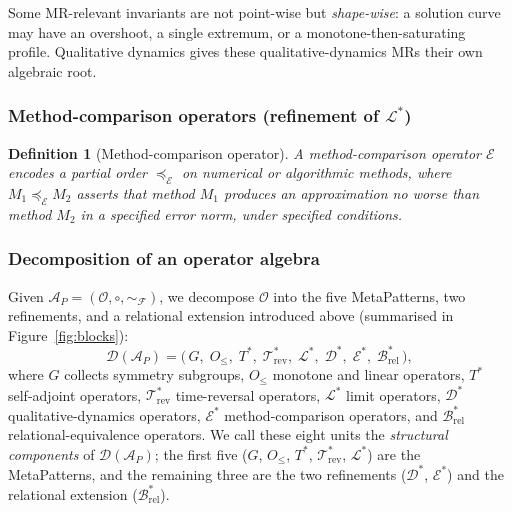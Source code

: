 \documentclass[acmsmall,screen,review]{acmart}
\newtheorem{definition}{Definition}
\begin{document}
Some MR-relevant invariants are not point-wise but \emph{shape-wise}: a solution curve may have an overshoot, a single extremum, or a monotone-then-saturating profile. Qualitative dynamics gives these qualitative-dynamics MRs their own algebraic root.

\subsubsection{Method-comparison operators (refinement of $\mathcal{L}^{*}$)}

\begin{definition}[Method-comparison operator]
A \emph{method-comparison operator} $\mathcal{E}$ encodes a partial order $\preceq_{\mathcal{E}}$ on numerical or algorithmic methods, where $M_1 \preceq_{\mathcal{E}} M_2$ asserts that method $M_1$ produces an approximation no worse than method $M_2$ in a specified error norm, under specified conditions.
\end{definition}

\subsubsection{Decomposition of an operator algebra}
\label{subsec:decomposition}

Given $\mathcal{A}_P = (\mathcal{O}, \circ, \sim_{\mathcal{F}})$, we decompose $\mathcal{O}$ into the five MetaPatterns, two refinements, and a relational extension introduced above (summarised in Figure~\ref{fig:blocks}):
$$\mathcal{D}(\mathcal{A}_P) = \bigl(\,G,\; O_{\le},\; T^{*},\; \mathcal{T}^{*}_{\mathrm{rev}},\; \mathcal{L}^{*},\; \mathcal{D}^{*},\; \mathcal{E}^{*},\; \mathcal{B}^{*}_{\mathrm{rel}}\,\bigr),$$
where $G$ collects symmetry subgroups, $O_{\le}$ monotone and linear operators, $T^{*}$ self-adjoint operators, $\mathcal{T}^{*}_{\mathrm{rev}}$ time-reversal operators, $\mathcal{L}^{*}$ limit operators, $\mathcal{D}^{*}$ qualitative-dynamics operators, $\mathcal{E}^{*}$ method-comparison operators, and $\mathcal{B}^{*}_{\mathrm{rel}}$ relational-equivalence operators. We call these eight units the \emph{structural components} of $\mathcal{D}(\mathcal{A}_P)$; the first five ($G$, $O_{\le}$, $T^{*}$, $\mathcal{T}^{*}_{\mathrm{rev}}$, $\mathcal{L}^{*}$) are the MetaPatterns, and the remaining three are the two refinements ($\mathcal{D}^{*}$, $\mathcal{E}^{*}$) and the relational extension ($\mathcal{B}^{*}_{\mathrm{rel}}$).
\end{document}
